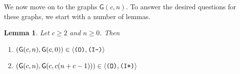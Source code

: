 \documentclass[12pt]{amsbook}%
\newtheorem{lemma}[theor]{Lemma}
\theoremstyle{defin}
\theoremstyle{remark}
\numberwithin{equation}{chapter}
\numberwithin{theor}{section}
\newcommand{\IIIm}{\mbox{\texttt{\textup{(I-)}}}}
\newcommand{\IIIp}{\mbox{\texttt{\textup{(I+)}}}}
\newcommand{\OOO}{\mbox{\texttt{\textup{(O)}}}}
\newcommand{\RRRp}{\mbox{\texttt{\textup{(R+)}}}}
\newcommand{\GO}{{\mathsf G}}
\begin{document}
 
 We now move on to the graphs $\GO(c,n)$.  To answer the desired questions for these graphs, we start with a number of lemmas.
 
  \begin{lemma}\label{GOmoves} Let $c \geq 2$ and $n \geq 0$. Then
\begin{enumerate}[(1)]
\item $(\GO(c,n),\GO(c,0))\in\langle \OOO,\IIIm\rangle$
\item $(\GO(c,n),\GO(c,c(n+c-1))) \in\langle \OOO,\IIIp\rangle$
\end{enumerate}
\end{lemma}
\end{document}
